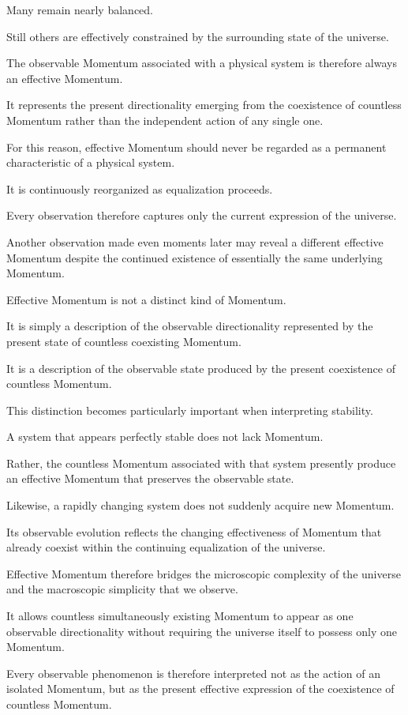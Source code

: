Many remain nearly balanced.

Still others are effectively constrained by the surrounding state of the universe.

The observable Momentum associated with a physical system is therefore always an effective Momentum.

It represents the present directionality emerging from the coexistence of countless Momentum rather than the independent action of any single one.

For this reason, effective Momentum should never be regarded as a permanent characteristic of a physical system.

It is continuously reorganized as equalization proceeds.

Every observation therefore captures only the current expression of the universe.

Another observation made even moments later may reveal a different effective Momentum despite the continued existence of essentially the same underlying Momentum.

Effective Momentum is not a distinct kind of Momentum.

It is simply a description of the observable directionality represented by the present state of countless coexisting Momentum.

It is a description of the observable state produced by the present coexistence of countless Momentum.

This distinction becomes particularly important when interpreting stability.

A system that appears perfectly stable does not lack Momentum.

Rather, the countless Momentum associated with that system presently produce an effective Momentum that preserves the observable state.

Likewise, a rapidly changing system does not suddenly acquire new Momentum.

Its observable evolution reflects the changing effectiveness of Momentum that already coexist within the continuing equalization of the universe.

Effective Momentum therefore bridges the microscopic complexity of the universe and the macroscopic simplicity that we observe.

It allows countless simultaneously existing Momentum to appear as one observable directionality without requiring the universe itself to possess only one Momentum.

Every observable phenomenon is therefore interpreted not as the action of an isolated Momentum, but as the present effective expression of the coexistence of countless Momentum.

